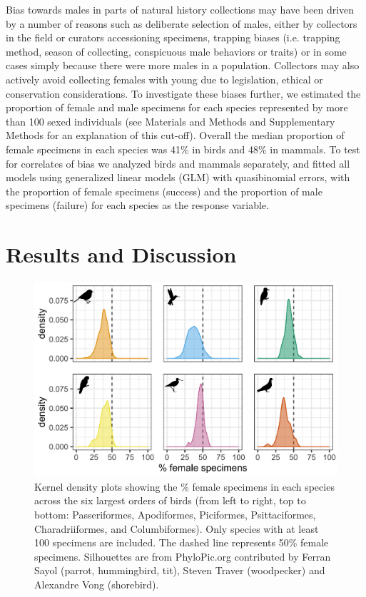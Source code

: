 \documentclass[a4paper, 12pt]{article}
\begin{document}
\newpage


Bias towards males in parts of natural history collections may have been driven by a number of reasons such as deliberate selection of males, either by collectors in the field or curators accessioning specimens, trapping biases (i.e. trapping method, season of collecting, conspicuous male behaviors or traits) or in some cases simply because there were more males in a population. 
Collectors may also actively avoid collecting females with young due to legislation, ethical or conservation considerations. 
To investigate these biases further, we estimated the proportion of female and male specimens for each species represented by more than 100 sexed individuals (see Materials and Methods and Supplementary Methods for an explanation of this cut-off). 
Overall the median proportion of female specimens in each species was 41\% in birds and 48\% in mammals. 
To test for correlates of bias we analyzed birds and mammals separately, and fitted all models using generalized linear models (GLM) with quasibinomial errors, with the proportion of female specimens (success) and the proportion of male specimens (failure) for each species as the response variable.

\section{Results and Discussion}

\begin{figure}
 \centering
  \includegraphics[width = \linewidth]{figures/orders-density-birds-six.png}
  \caption{Kernel density plots showing the \% female specimens in each species across the six largest orders of birds (from left to right, top to bottom: Passeriformes, Apodiformes, Piciformes, Psittaciformes, Charadriiformes, and Columbiformes). 
  Only species with at least 100 specimens are included. 
  The dashed line represents 50\% female specimens. 
  Silhouettes are from PhyloPic.org contributed by Ferran Sayol (parrot, hummingbird, tit), Steven Traver (woodpecker) and Alexandre Vong (shorebird).}
  \label{fig-bird_order_six}
\end{figure}
\end{document}
